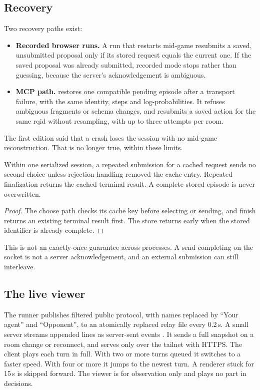 \subsection{Recovery}
Two recovery paths exist:
\begin{itemize}
  \item \textbf{Recorded browser runs.} A run that restarts mid-game resubmits
    a saved, unsubmitted proposal only if its stored request equals the
    current one. If the saved proposal was already submitted, recorded mode stops
    rather than guessing, because the server's acknowledgement is ambiguous.
  \item \textbf{MCP path.}  restores one compatible pending
    episode after a transport failure, with the same identity, steps and
    log-probabilities. It refuses ambiguous fragments or schema changes, and
    resubmits a saved action for the same rqid without resampling, with up to
    three attempts per room.
\end{itemize}
The first edition said that a crash loses the session with no mid-game
reconstruction. That is no longer true, within these limits.

\begin{proposition}
\label{prop:idempotent}
Within one serialized session, a repeated submission for a cached request
sends no second choice unless rejection handling removed the cache entry.
Repeated finalization returns the cached terminal result. A complete stored
episode is never overwritten.
\end{proposition}
\begin{proof}
The choose path checks its cache key before selecting or sending, and finish
returns an existing terminal result first. The store returns early when the
stored identifier is already complete.
\end{proof}
This is not an exactly-once guarantee across processes. A send completing on
the socket is not a server acknowledgement, and an external submission can
still interleave.

\subsection{The live viewer}
The runner publishes filtered public protocol, with names replaced by ``Your
agent'' and ``Opponent'', to an atomically replaced relay file every 0.2\,s.
A small server streams appended lines as server-sent events \citep{sse}. It
sends a full snapshot on a room change or reconnect, and serves only over the
tailnet with HTTPS. The client plays each turn in full. With two or more
turns queued it switches to a faster speed. With four or more it jumps to the
newest turn. A renderer stuck for 15\,s is skipped forward. The viewer is for
observation only and plays no part in decisions.

